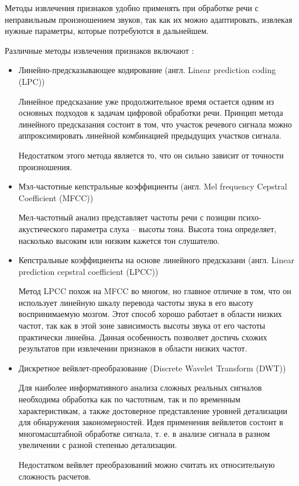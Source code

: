 Методы извлечения признаков удобно применять при обработке речи с неправильным произношением звуков, так как их можно адаптировать, извлекая нужные параметры, которые потребуются в дальнейшем.

Различные методы извлечения признаков включают \cite{isvparam1} \cite{isvparam2}:
\begin{itemize}
	\item Линейно-предсказывающее кодирование (англ. Linear prediction coding (LPC))
	
	Линейное предсказание уже продолжительное время остается одним из	основных подходов к задачам цифровой обработки речи. Принцип метода линейного предсказания состоит в том, что участок речевого сигнала можно аппроксимировать линейной комбинацией предыдущих участков сигнала.
	
	Недостатком этого метода является то, что он сильно зависит от точности произношения.
	
	\item Мэл-частотные кепстральные коэффициенты (англ. Mel frequency \newline Cepstral Coefficient (MFCC))
	
	Мел-частотный анализ представляет частоты речи с позиции психо-акустического параметра слуха – высоты тона. Высота тона определяет, насколько высоким или низким кажется тон слушателю. \cite{methodisb} \cite{methodisb2}
	
	\item  Кепстральные коэффициенты на основе линейного предсказани (англ. Linear prediction cepstral coefficient (LPCC))
	
	Метод LPCC похож на MFCC во многом, но главное отличие в том, что он использует линейную шкалу перевода частоты звука в его высоту воспринимаемую мозгом. Этот способ хорошо работает в области низких частот, так как в этой зоне зависимость высоты звука от его частоты	практически линейна. Данная особенность позволяет достичь схожих	результатов при извлечении признаков в области низких частот. \cite{methodisb} 
	
	\item Дискретное вейвлет-преобразование (Discrete Wavelet Transform (DWT))
	
		 Для наиболее информативного анализа сложных реальных сигналов необходима обработка как по частотным, так и по временным характеристикам, а также достоверное представление уровней детализации для обнаружения закономерностей. Идея применения вейвлетов состоит в многомасштабной обработке сигнала, т. е. в анализе сигнала в разном увеличении с разной степенью детализации. \cite{methodisb} \cite{methodisb2}
		 
		 Недостатком вейвлет преобразований можно считать их относительную сложность расчетов. 
\end{itemize}

